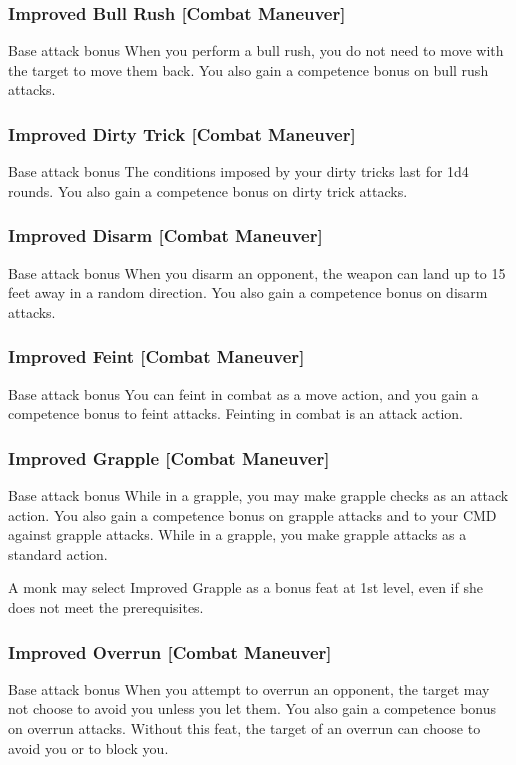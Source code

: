 \subsubsection{Improved Bull Rush [Combat Maneuver]}
 Base attack bonus 
 When you perform a bull rush, you do not need to move with the target to move them back. You also gain a  competence bonus on bull rush attacks.

\subsubsection{Improved Dirty Trick [Combat Maneuver]}
 Base attack bonus 
 The conditions imposed by your dirty tricks last for 1d4 rounds. You also gain a  competence bonus on dirty trick attacks.

\subsubsection{Improved Disarm [Combat Maneuver]}
 Base attack bonus 
 When you disarm an opponent, the weapon can land up to 15 feet away in a random direction. You also gain a  competence bonus on disarm attacks.

\subsubsection{Improved Feint [Combat Maneuver]}
 Base attack bonus 
 You can feint in combat as a move action, and you gain a  competence bonus to feint attacks.
 Feinting in combat is an attack action.

\subsubsection{Improved Grapple [Combat Maneuver]}
 Base attack bonus 
 While in a grapple, you may make grapple checks as an attack action. You also gain a  competence bonus on grapple attacks and to your CMD against grapple attacks.
 While in a grapple, you make grapple attacks as a standard action.
\par A monk may select Improved Grapple as a bonus feat at 1st level, even if she does not meet the prerequisites.

\subsubsection{Improved Overrun [Combat Maneuver]}
 Base attack bonus 
 When you attempt to overrun an opponent, the target may not choose to avoid you unless you let them. You also gain a  competence bonus on overrun attacks.
 Without this feat, the target of an overrun can choose to avoid you or to block you.

